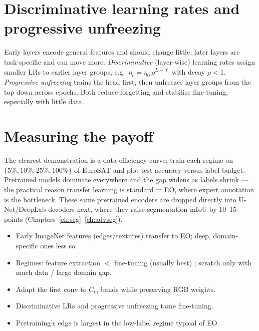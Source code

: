 \section{Discriminative learning rates and progressive unfreezing}

Early layers encode general features and should change little; later layers are
task-specific and can move more. \emph{Discriminative} (layer-wise) learning
rates assign smaller LRs to earlier layer groups, e.g.\ $\eta_\ell =
\eta_0\,\rho^{L-\ell}$ with decay $\rho<1$. \emph{Progressive unfreezing} trains
the head first, then unfreezes layer groups from the top down across epochs.
Both reduce forgetting and stabilise fine-tuning, especially with little data.

\section{Measuring the payoff}

The clearest demonstration is a data-efficiency curve: train each regime on
$\{5\%, 10\%, 25\%, 100\%\}$ of EuroSAT and plot test accuracy versus label
budget. Pretrained models dominate everywhere and the gap widens as labels
shrink --- the practical reason transfer learning is standard in EO, where
expert annotation is the bottleneck. These same pretrained encoders are dropped
directly into U-Net/DeepLab decoders next, where they raise segmentation mIoU by
10--15 points (Chapters~\ref{ch:seg}--\ref{ch:advseg}).

\begin{keybox}
\begin{itemize}[leftmargin=1.2em,nosep]
  \item Early ImageNet features (edges/textures) transfer to EO; deep, domain-specific ones less so.
  \item Regimes: feature extraction $<$ fine-tuning (usually best) ; scratch only with much data / large domain gap.
  \item Adapt the first conv to $C_\mathrm{in}$ bands while preserving RGB weights.
  \item Discriminative LRs and progressive unfreezing tame fine-tuning.
  \item Pretraining's edge is largest in the low-label regime typical of EO.
\end{itemize}
\end{keybox}

